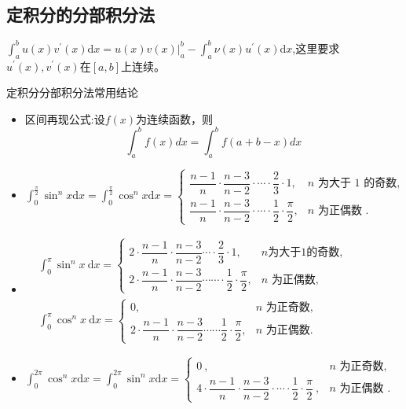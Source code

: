 \documentclass[8pt a4paper, oneside, UTF8]{ctexbook}  %
\begin{document}
\begin{sloppypar}
    \subsection{定积分的分部积分法}
    $\int_{a}^{b}u(x)v^{\prime}(x)$d$x=u(x)v(x)\Big|_a^{b}-\int_{a}^{b}\nu(x)u^{\prime}(x)$d$x$,这里要求$u^\prime(x),v^{\prime}(x)$在$[a,b]$上连续。
    \begin{conclusion}{定积分分部积分法常用结论}{}
        \begin{itemize}
            \item 区间再现公式:设$f(x)$为连续函数，则$$\int_{a}^{b}f(x)dx=\int_{a}^{b}f(a+b-x)dx$$
            \item $\int_{0}^{\frac{\pi}{2}}\sin^{n}x\mathrm{d}x=\int_{0}^{\frac{\pi}{2}}\cos^{n}x\mathrm{d}x=\begin{cases}\dfrac{n-1}{n} \cdot \dfrac{n-3}{n-2} \cdot \cdots \cdot \dfrac{2}{3} \cdot 1,&n\text{ 为大于 1 的奇数,}\\ \dfrac{n-1}{n} \cdot \dfrac{n-3}{n-2} \cdot \cdots \cdot \dfrac{1}{2} \cdot \dfrac{\pi}{2},&n\text{ 为正偶数 }.\end{cases}$
            \item $\begin{aligned} & \int_0^\pi \sin ^n x \mathrm{~d} x= \begin{cases}2 \cdot \dfrac{n-1}{n} \cdot \dfrac{n-3}{n-2} \cdots \cdot \dfrac{2}{3} \cdot 1, & n \text {为大于} 1 \text {的奇数, } \\ 2 \cdot \dfrac{n-1}{n} \cdot \dfrac{n-3}{n-2} \cdots \cdots \cdot \dfrac{1}{2} \cdot \dfrac{\pi}{2}, & n \text { 为正偶数, }\end{cases} \\ & \int_0^\pi \cos ^n x \mathrm{~d} x= \begin{cases}0, & n \text { 为正奇数, } \\ 2 \cdot \dfrac{n-1}{n} \cdot \dfrac{n-3}{n-2} \cdots \cdots \dfrac{1}{2} \cdot \dfrac{\pi}{2}, & n \text { 为正偶数. }\end{cases} \end{aligned}$
            \item $\int_{0}^{2\pi}\cos^{n}x\mathrm{d}x=\int_{0}^{2\pi}\sin^{n}x\mathrm{d}x=\begin{cases}0\:,&n\text{ 为正奇数,}\\4\cdot\dfrac{n-1}{n}\cdot\dfrac{n-3}{n-2}\cdot\cdots\cdot\dfrac{1}{2}\cdot\dfrac{\pi}{2}\:,&n\text{ 为正偶数 }.\end{cases}$
        \end{itemize}
    \end{conclusion}
    \ifx\allfiles\undefined
\end{sloppypar}
\end{document}
